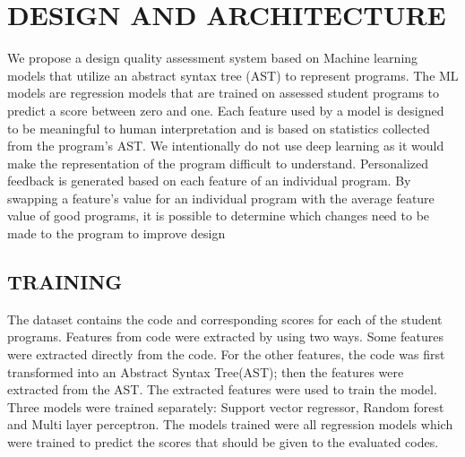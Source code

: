 
\chapter{DESIGN AND ARCHITECTURE}


We propose a design quality assessment system based on Machine
learning models that utilize an abstract syntax tree (AST) to
represent programs. The ML models are regression models that are
trained on assessed student programs to predict a score between zero
and one. Each feature used by a model is designed to be meaningful to
human interpretation and is based on statistics collected from the
program's AST. We intentionally do not use deep learning as it would
make the representation of the program difficult to
understand. Personalized feedback is generated based on each feature
of an individual program. By swapping a feature's value for an
individual program with the average feature value of good programs, it
is possible to determine which changes need to be made to the program
to improve design


\section{TRAINING} 

The dataset contains the code and corresponding scores for each of the
student programs. Features from code were extracted by using two
ways. Some features were extracted directly from the code. For the
other features, the code was first transformed into an Abstract Syntax
Tree(AST); then the features were extracted from the AST. The extracted
features were used to train the model. Three models were trained
separately: Support vector regressor, Random forest and Multi layer
perceptron. The models trained were all regression models which were
trained to predict the scores that should be given to the evaluated
codes.

